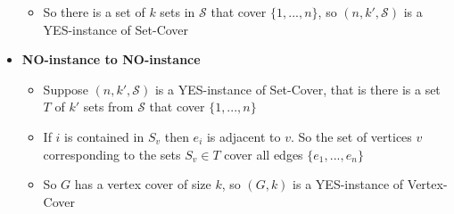 \documentclass[10pt,landscape,a4paper]{article}
\begin{document}
\begin{multicols*}{4}
\begin{itemize}
\begin{itemize}
			      \item So there is a set of $k$ sets in $\mathcal{S}$ that cover $\{1,...,n\}$, so $(n,k',\mathcal{S})$ is a YES-instance of Set-Cover
		      \end{itemize}
		\item \textbf{NO-instance to NO-instance}
		      \begin{itemize}
			      \item Suppose $(n,k',\mathcal{S})$ is a YES-instance of Set-Cover, that is there is a set $T$ of $k'$ sets from $\mathcal{S}$ that cover $\{1,...,n\}$
			      \item If $i$ is contained in $S_v$ then $e_i$ is adjacent to $v$. So the set of vertices $v$ corresponding to the sets $S_v\in T$ cover all edges $\{e_1,...,e_n\}$
			      \item So $G$ has a vertex cover of size $k$, so $(G,k)$ is a YES-instance of Vertex-Cover
		      \end{itemize}
	\end{itemize}
	\vfill\null\columnbreak

\end{multicols*}
\end{document}
